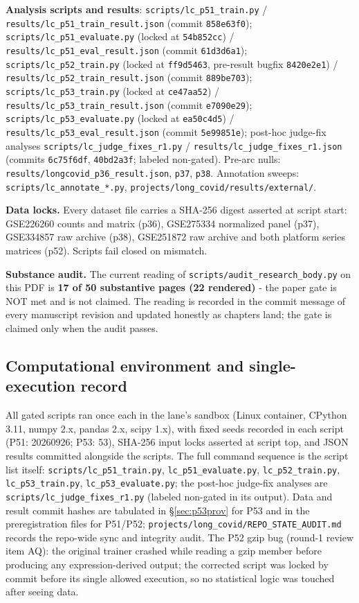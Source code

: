 \documentclass[11pt,a4paper]{article}
\begin{document}
\textbf{Analysis scripts and results}: \texttt{scripts/lc\_p51\_train.py} /
\texttt{results/lc\_p51\_train\_result.json} (commit \texttt{858e63f0});
\texttt{scripts/lc\_p51\_evaluate.py} (locked at \texttt{54b852cc}) /
\texttt{results/lc\_p51\_eval\_result.json} (commit \texttt{61d3d6a1});
\texttt{scripts/lc\_p52\_train.py} (locked at \texttt{ff9d5463}, pre-result
bugfix \texttt{8420e2e1}) / \texttt{results/lc\_p52\_train\_result.json}
(commit \texttt{889be703}); \texttt{scripts/lc\_p53\_train.py} (locked at
\texttt{ce47aa52}) / \texttt{results/lc\_p53\_train\_result.json} (commit
\texttt{e7090e29}); \texttt{scripts/lc\_p53\_evaluate.py} (locked at
\texttt{ea50c4d5}) / \texttt{results/lc\_p53\_eval\_result.json} (commit
\texttt{5e99851e}); post-hoc judge-fix analyses
\texttt{scripts/lc\_judge\_fixes\_r1.py} /
\texttt{results/lc\_judge\_fixes\_r1.json} (commits \texttt{6c75f6df},
\texttt{40bd2a3f}; labeled non-gated). Pre-arc nulls:
\texttt{results/longcovid\_p36\_result.json}, \texttt{p37}, \texttt{p38}.
Annotation sweeps: \texttt{scripts/lc\_annotate\_*.py},
\texttt{projects/long\_covid/results/external/}.

\textbf{Data locks.} Every dataset file carries a SHA-256 digest asserted at
script start: GSE226260 counts and matrix (p36), GSE275334 normalized panel
(p37), GSE334857 raw archive (p38), GSE251872 raw archive and both
platform series matrices (p52). Scripts fail closed on mismatch.

\textbf{Substance audit.} The current reading of
\texttt{scripts/audit\_research\_body.py} on this PDF is \textbf{17 of 50
substantive pages (22 rendered)} - the paper gate is NOT met and is not
claimed. The reading is recorded in the commit message of every manuscript
revision and updated honestly as chapters land; the gate is claimed only
when the audit passes.


\subsection{Computational environment and single-execution record}
All gated scripts ran once each in the lane's sandbox (Linux container,
CPython 3.11, numpy 2.x, pandas 2.x, scipy 1.x), with fixed seeds recorded
in each script (P51: 20260926; P53: 53), SHA-256 input locks asserted at
script top, and JSON results committed alongside the scripts. The full
command sequence is the script list itself:
\texttt{scripts/lc\_p51\_train.py}, \texttt{lc\_p51\_evaluate.py},
\texttt{lc\_p52\_train.py}, \texttt{lc\_p53\_train.py},
\texttt{lc\_p53\_evaluate.py}; the post-hoc judge-fix analyses are
\texttt{scripts/lc\_judge\_fixes\_r1.py} (labeled non-gated in its
output). Data and result commit hashes are tabulated in
\S\ref{sec:p53prov} for P53 and in the preregistration files for P51/P52;
\texttt{projects/long\_covid/REPO\_STATE\_AUDIT.md} records the
repo-wide sync and integrity audit. The P52 gzip bug (round-1 review item
AQ): the original trainer crashed while reading a gzip member before
producing any expression-derived output; the corrected script was locked by
commit before its single allowed execution, so no statistical logic was
touched after seeing data.
\end{document}
